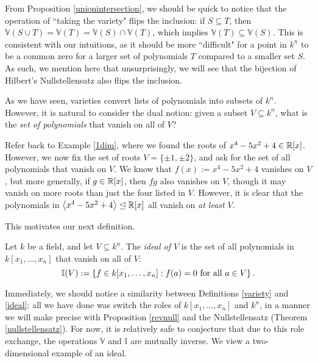 \documentclass{article}
\newcommand{\V}{\mathbb V}
\newcommand{\I}{\mathbb I}
\begin{document}
\begin{remark}\label{inclusionflip}
From Proposition \ref{unionintersection}, we should be quick to notice that the operation of ``taking the variety" flips the inclusion: if $S\subseteq T$, then $\V(S\cup T) = \V(T) = \V(S)\cap \V(T)$, which implies $\V(T)\subseteq \V(S)$. This is consistent with our intuitions, as it should be more ``difficult" for a point in $k^n$ to be a common zero for a larger set of polynomials $T$ compared to a smaller set $S$. As such, we mention here that unsurprisingly, we will see that the bijection of Hilbert's Nullstellensatz also flips the inclusion.
\end{remark}

As we have seen, varieties convert lists of polynomials into subsets of $k^n$. However, it is natural to consider the dual notion: given a subset $V\subseteq k^n$, what is the \textit{set of polynomials} that vanish on all of $V$?

\begin{example}\label{1dideal}
Refer back to Example \ref{1dim}, where we found the roots of $x^4-5x^2+4\in \mathbb R[x]$. However, we now fix the set of roots $V = \{\pm 1, \pm 2\}$, and ask for the set of all polynomials that vanish on $V$. We know that $f(x) := x^4-5x^2+4$ vanishes on $V$, but more generally, if $g\in \mathbb R[x]$, then $fg$ also vanishes on $V$, though it may vanish on more roots than just the four listed in $V$. However, it is clear that the polynomials in $\left\langle x^4-5x^2+4\right\rangle\trianglelefteq \mathbb R[x]$ all vanish on \textit{at least} $V$.
\end{example}

This motivates our next definition.

\begin{definition}\label{ideal}
Let $k$ be a field, and let $V\subseteq k^n$. The \textit{ideal of $V$} is the set of all polynomials in $k[x_1, \ldots, x_n]$ that vanish on all of $V$:
$$\I(V) := \set{f\in k[x_1,\ldots, x_n]: f(a) = 0 \textrm{ for all } a\in V}.$$
\end{definition}
Immediately, we should notice a similarity between Definitions \ref{variety} and \ref{ideal}: all we have done was switch the roles of $k[x_1, \ldots, x_n]$ and $k^n$, in a manner we will make precise with Proposition \ref{revnull} and the Nullstellensatz (Theorem \ref{nullstellensatz}). For now, it is relatively safe to conjecture that due to this role exchange, the operations $\V$ and $\I$ are mutually inverse. We view a two-dimensional example of an ideal.
\end{document}
